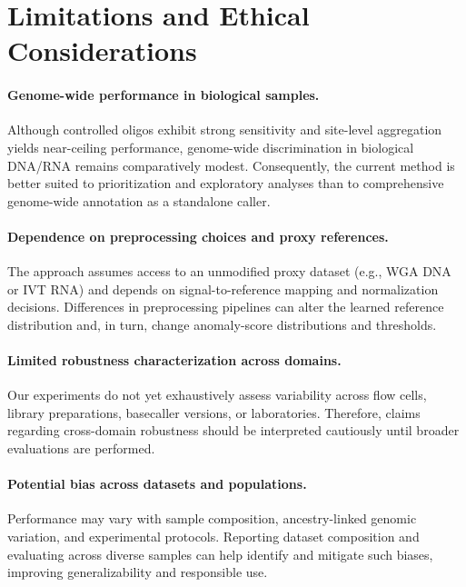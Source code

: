 \documentclass[journal,article,submit,pdftex,moreauthors]{Definitions/mdpi}
\begin{document}
\section{Limitations and Ethical Considerations}
\paragraph{Genome-wide performance in biological samples.}
Although controlled oligos exhibit strong sensitivity and site-level aggregation yields near-ceiling performance, genome-wide discrimination in biological DNA/RNA remains comparatively modest. Consequently, the current method is better suited to prioritization and exploratory analyses than to comprehensive genome-wide annotation as a standalone caller.

\paragraph{Dependence on preprocessing choices and proxy references.}
The approach assumes access to an unmodified proxy dataset (e.g., WGA DNA or IVT RNA) and depends on signal-to-reference mapping and normalization decisions. Differences in preprocessing pipelines can alter the learned reference distribution and, in turn, change anomaly-score distributions and thresholds.

\paragraph{Limited robustness characterization across domains.}
Our experiments do not yet exhaustively assess variability across flow cells, library preparations, basecaller versions, or laboratories. Therefore, claims regarding cross-domain robustness should be interpreted cautiously until broader evaluations are performed.

\paragraph{Potential bias across datasets and populations.}
Performance may vary with sample composition, ancestry-linked genomic variation, and experimental protocols. Reporting dataset composition and evaluating across diverse samples can help identify and mitigate such biases, improving generalizability and responsible use.
\end{document}
